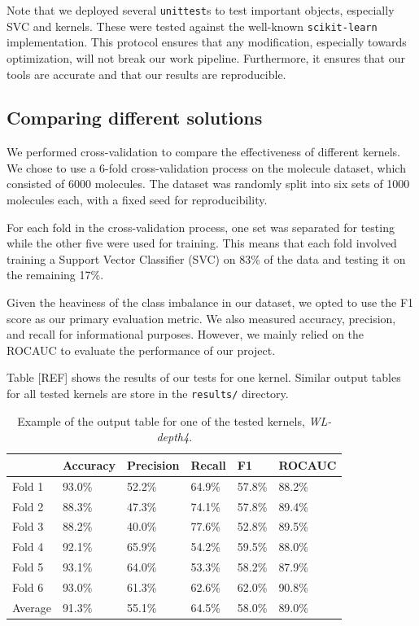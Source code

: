 \documentclass{IEEEtran}
\begin{document}
Note that we deployed several \texttt{unittest}s to test important objects, especially SVC and kernels. These were tested against the well-known \texttt{scikit-learn} implementation. This protocol ensures that any modification, especially towards optimization, will not break our work pipeline. Furthermore, it ensures that our tools are accurate and that our results are reproducible.

\subsection{Comparing different solutions}
We performed cross-validation to compare the effectiveness of different kernels. We chose to use a 6-fold cross-validation process on the molecule dataset, which consisted of 6000 molecules. The dataset was randomly split into six sets of 1000 molecules each, with a fixed seed for reproducibility.

For each fold in the cross-validation process, one set was separated for testing while the other five were used for training. This means that each fold involved training a Support Vector Classifier (SVC) on 83\% of the data and testing it on the remaining 17\%.

Given the heaviness of the class imbalance in our dataset, we opted to use the F1 score as our primary evaluation metric. We also measured accuracy, precision, and recall for informational purposes. However, we mainly relied on the ROCAUC to evaluate the performance of our project.

Table [REF] shows the results of our tests for one kernel.
Similar output tables for all tested kernels are store in the \texttt{results/} directory.

\begin{table}[h]
    \centering
    \begin{tabular}{l||llll|l}
                & Accuracy & Precision & Recall & F1     & ROCAUC \\
        \hline \hline
        Fold 1  & 93.0\%   & 52.2\%    & 64.9\% & 57.8\% & 88.2\% \\
        Fold 2  & 88.3\%   & 47.3\%    & 74.1\% & 57.8\% & 89.4\% \\
        Fold 3  & 88.2\%   & 40.0\%    & 77.6\% & 52.8\% & 89.5\% \\
        Fold 4  & 92.1\%   & 65.9\%    & 54.2\% & 59.5\% & 88.0\% \\
        Fold 5  & 93.1\%   & 64.0\%    & 53.3\% & 58.2\% & 87.9\% \\
        Fold 6  & 93.0\%   & 61.3\%    & 62.6\% & 62.0\% & 90.8\% \\
        \hline
        Average & 91.3\%   & 55.1\%    & 64.5\% & 58.0\% & 89.0\% \\
    \end{tabular}
    \caption{Example of the output table for one of the tested kernels, \emph{WL-depth4}.}
    \label{tab:example}
\end{table}
\end{document}
